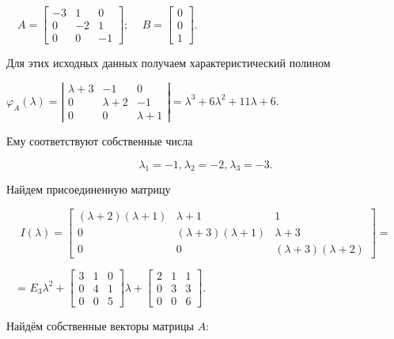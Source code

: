 		\ \  $A=\left[\begin{matrix}-3&1&0\\0&-2&1\\0&0&-1\end{matrix}\right]$; \ \ 
		$B=\left[\begin{matrix}0\\0\\1\end{matrix}\right]$.



		Для этих исходных данных получаем характеристический полином



		$\varphi _A(\lambda )=|\begin{matrix}\lambda +3&-1&0\\0&\lambda +2&-1\\0&0&\lambda +1\end{matrix}|=\lambda ^3+6\lambda ^2+11\lambda +6$.



		Ему соответствуют собственные числа


\begin{equation*}
\lambda _1=-1,^{}\lambda _2=-2,^{}\lambda _3=-3.
\end{equation*}

		Найдем присоединенную матрицу


\begin{equation*}
I(\lambda )=\left[\begin{matrix}(\lambda +2)(\lambda +1)&\lambda +1&1\\0&(\lambda +3)(\lambda +1)&\lambda +3\\0&0&(\lambda +3)(\lambda +2)\end{matrix}\right]=
\end{equation*}

		\ \ =
		$E_3\lambda ^2+\left[\begin{matrix}3&1&0\\0&4&1\\0&0&5\end{matrix}\right]\lambda +\left[\begin{matrix}2&1&1\\0&3&3\\0&0&6\end{matrix}\right].$



		Найдём собственные векторы матрицы  $A$:


